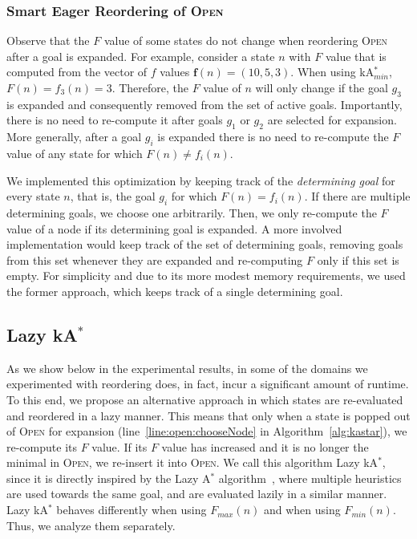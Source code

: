 \documentclass{aicom2e}
\newcommand{\astar}{A$^*$}
\newcommand{\kastar}{kA$^*$}
\newcommand{\kastarmin}{kA$^*_{min}$}
\newcommand{\minf}{$F_{min}(n)$}
\newcommand{\maxf}{$F_{max}(n)$}
\newcommand{\open}{\textsc{Open}}
\begin{document}
\subsubsection{Smart Eager Reordering of \open{}}
\label{sec:smart-eager}
Observe that the $F$ value of some states do not change when reordering \open{} after a goal is expanded.
For example, consider a state $n$ with $F$ value that is computed from the vector of $f$ values $\textbf{f}(n)=(10,5,3)$. When using \kastarmin{}, $F(n)=f_3(n)=3$. Therefore, the $F$ value of $n$ will only change if the goal $g_3$ is expanded and consequently removed from the set of active goals. Importantly, there is no need to re-compute it after goals $g_1$ or $g_2$ are selected for expansion. More generally, after a goal $g_i$ is expanded there is no need to re-compute the $F$ value
of any state for which $F(n)\neq f_i(n)$.

We implemented this optimization by keeping track of the {\em determining goal} for every state $n$,
that is, the goal $g_i$ for which $F(n)=f_i(n)$. If there are multiple determining goals, we choose one arbitrarily. Then, we only re-compute the $F$ value of a node if its determining goal is expanded. A more involved implementation would keep track of the set of determining goals, removing goals from this set whenever they are expanded and re-computing $F$ only if this set is empty. For simplicity and due to its more modest memory requirements, we used the former approach, which keeps track of a single determining goal.





\subsection{Lazy \kastar{}}

As we show below in the experimental results, in some of the domains we experimented with reordering does, in fact, incur a significant amount of runtime.
To this end, we propose an alternative approach
in which states are re-evaluated and reordered in a lazy manner. This means
that only when a state is popped out of \open{} for expansion
(line~\ref{line:open:chooseNode} in Algorithm~\ref{alg:kastar}), we
re-compute its $F$ value. If its $F$ value has increased and it is no
longer the minimal in \open, we re-insert it into \open{}. We call this
algorithm Lazy \kastar{}, since it is directly inspired by the Lazy \astar{}
algorithm~\cite{betzalel2015typeSystem,tolpin2013toward}, where multiple
heuristics are used towards the same goal, and are evaluated lazily in a
similar manner. Lazy \kastar{} behaves differently when using \maxf{} and when using \minf{}. Thus, we analyze them separately.  %
\end{document}
